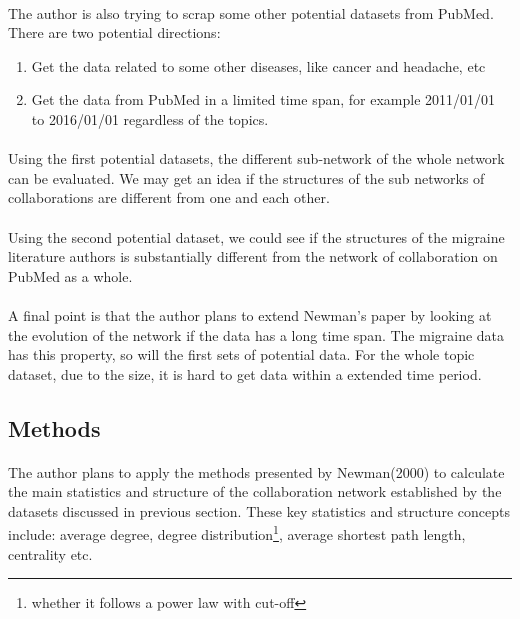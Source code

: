 \documentclass[12pt]{article}
\begin{document}
\paragraph{}
The author is also trying to scrap some other potential datasets from PubMed. There are two potential directions: 
\begin{enumerate}
	\item Get the data related to some other diseases, like cancer and headache, etc
	\item Get the data from PubMed in a limited time span, for example 2011/01/01 to 2016/01/01 regardless of the topics. 
\end{enumerate}
\paragraph{}
Using the first potential datasets, the different sub-network of the whole network can be evaluated. We may get an idea if the structures of the sub networks of collaborations are different from one and each other. 
\paragraph{}
Using the second potential dataset, we could see if the structures of the migraine literature authors is substantially different from the network of collaboration on PubMed as a whole. 
\paragraph{}
A final point is that the author plans to extend Newman's paper by looking at the evolution of the network if the data has a long time span. The migraine data has this property, so will the first sets of potential data. For the whole topic dataset, due to the size, it is hard to get data within a extended time period. 
\subsection{Methods}
\paragraph{}
The author plans to apply the methods presented by Newman(2000) to calculate the main statistics and structure of the collaboration network established by the datasets discussed in previous section. These key statistics and structure concepts include: average degree, degree distribution\footnote{whether it follows a power law with cut-off}, average shortest path length, centrality etc. 
\end{document}
